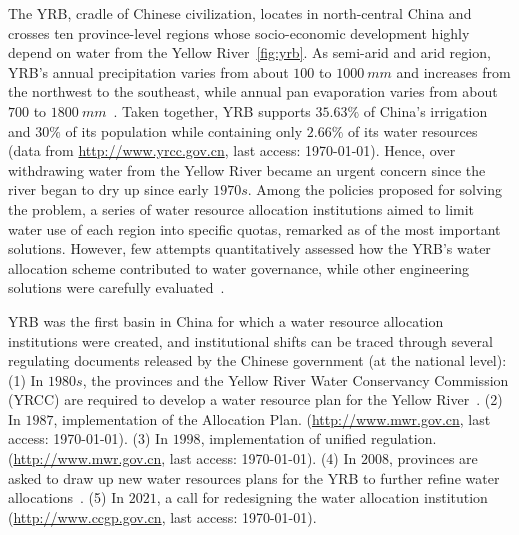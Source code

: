 
The YRB, cradle of Chinese civilization, locates in north-central China and crosses ten province-level regions whose socio-economic development highly depend on water from the Yellow River~\ref{fig:yrb}.
As semi-arid and arid region, YRB's annual precipitation varies from about $100$ to $1000~mm$ and increases from the northwest to the southeast, while annual pan evaporation varies from about $700$ to $1800~mm$~\cite{wang2022e}.
Taken together, YRB supports $35.63\%$ of China's irrigation and $30\%$ of its population while containing only $2.66\%$ of its water resources (data from \href{http://www.yrcc.gov.cn}{http://www.yrcc.gov.cn}, last access: \today).
Hence, over withdrawing water from the Yellow River became an urgent concern since the river began to dry up since early $1970s$.
Among the policies proposed for solving the problem, a series of water resource allocation institutions aimed to limit water use of each region into specific quotas, remarked as of the most important solutions.
However, few attempts quantitatively assessed how the YRB's water allocation scheme contributed to water governance, while other engineering solutions were carefully evaluated~\cite{long2020}.


YRB was the first basin in China for which a water resource allocation institutions were created, and institutional shifts can be traced through several regulating documents released by the Chinese government (at the national level)\cite{wang2019a}:
(1) In $1980s$, the provinces and the Yellow River Water Conservancy Commission (YRCC) are required to develop a water resource plan for the Yellow River~\cite{wang2019, wang2019a}.
(2) In $1987$, implementation of the Allocation Plan. (\href{http://www.gov.cn/zhengce/content/2011-03/30/content_3138.htm#}{http://www.mwr.gov.cn}, last access: \today).
(3) In $1998$, implementation of unified regulation. (\href{http://www.mwr.gov.cn/ztpd/2013ztbd/2013fxkh/fxkhswcbcs/cs/flfg/201304/t20130411_433489.html}{http://www.mwr.gov.cn}, last access: \today).
(4) In $2008$, provinces are asked to draw up new water resources plans for the YRB to further refine water allocations~\cite{wang2019,wang2019a}.
(5) In $2021$, a call for redesigning the water allocation institution (\href{http://www.ccgp.gov.cn/cggg/zygg/gkzb/202107/t20210721_16591901.htm}{http://www.ccgp.gov.cn}, last access: \today).


